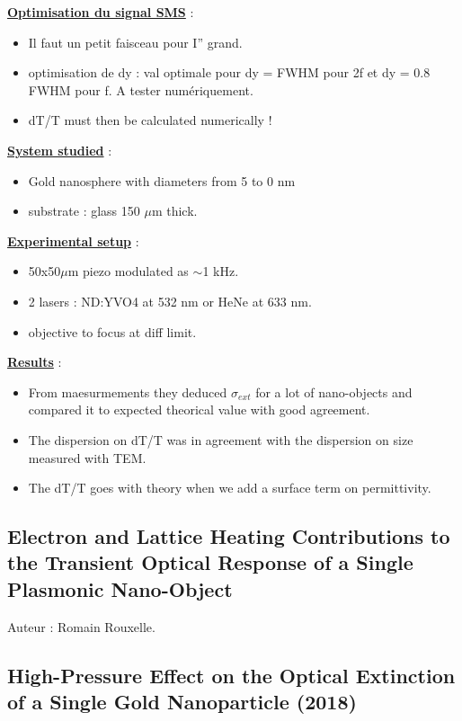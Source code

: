 \documentclass{article}
\begin{document}
\underline{\textbf{Optimisation du signal SMS}} :
\begin{itemize}
    \item Il faut un petit faisceau pour I'' grand.
    \item optimisation de dy : val optimale pour dy = FWHM pour 2f et dy = 0.8 FWHM pour f. A tester numériquement.
    \item dT/T must then be calculated numerically !
\end{itemize}

\underline{\textbf{System studied}} :
\begin{itemize}
    \item Gold nanosphere with diameters from 5 to 0 nm
    \item substrate : glass 150 $\mu$m thick.
\end{itemize}

\underline{\textbf{Experimental setup}} :
\begin{itemize}
    \item 50x50$\mu$m piezo modulated as $\sim$1 kHz.
    \item 2 lasers : ND:YVO4 at 532 nm or HeNe at 633 nm.
    \item objective to focus at diff limit.
\end{itemize}

\underline{\textbf{Results}} : 
\begin{itemize}
    \item From maesurmements they deduced $\sigma_{ext}$ for a lot of nano-objects and compared it to expected theorical value with good agreement.
    \item The dispersion on dT/T was in agreement with the dispersion on size measured with TEM.
    \item The dT/T goes with theory when we add a surface term on permittivity.
\end{itemize}


\subsection*{Electron and Lattice Heating Contributions to the Transient Optical
Response of a Single Plasmonic Nano-Object}

Auteur : Romain Rouxelle.



\subsection*{High-Pressure Effect on the Optical Extinction
of a Single Gold Nanoparticle (2018)}
\end{document}
